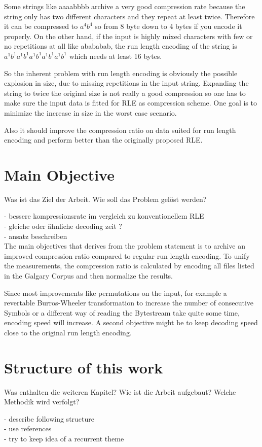 Some strings like aaaabbbb archive a very good compression rate because the string only has two different characters and they repeat at least twice. Therefore it can be compressed to $a^4b^4$ so from 8 byte down to 4 bytes if you encode it properly. On the other hand, if the input is highly mixed characters with few or no repetitions at all like abababab, the run length encoding of the string is $a^1b^1a^1b^1a^1b^1a^1b^1a^1b^1$ which needs at least 16 bytes. \par
So the inherent problem with run length encoding is obviously the possible explosion in size, due to missing repetitions in the input string. Expanding the string to twice the original size is not really a good compression so one has to make sure the input data is fitted for RLE as compression scheme. One goal is to minimize the increase in size in the worst case scenario. \par
Also it should improve the compression ratio on data suited for run length encoding and perform better than the originally proposed RLE.

\section{Main Objective}
\label{ch:Introduction:sec:Main Objective}

Was ist das Ziel der Arbeit. Wie soll das Problem gelöst werden?

- bessere kompressionsrate im vergleich zu konventionellem RLE\\
- gleiche oder ähnliche decoding zeit ?\\
- ansatz beschreiben\\

The main objectives that derives from the problem statement is to archive an improved compression ratio compared to regular run length encoding. To unify the measurements, the compression ratio is calculated by encoding all files listed in the Galgary Corpus and then normalize the results. \par
Since most improvements like permutations on the input, for example a revertable Burros-Wheeler transformation to increase the number of consecutive Symbols or a different way of reading the Bytestream take quite some time, encoding speed will increase. A second objective might be to keep decoding speed close to the original run length encoding.

\section{Structure of this work}
\label{ch:Intoduction:sec:Structure}

Was enthalten die weiteren Kapitel? Wie ist die Arbeit aufgebaut? Welche Methodik wird verfolgt?

- describe following structure\\
- use references\\
- try to keep idea of a recurrent theme\\

